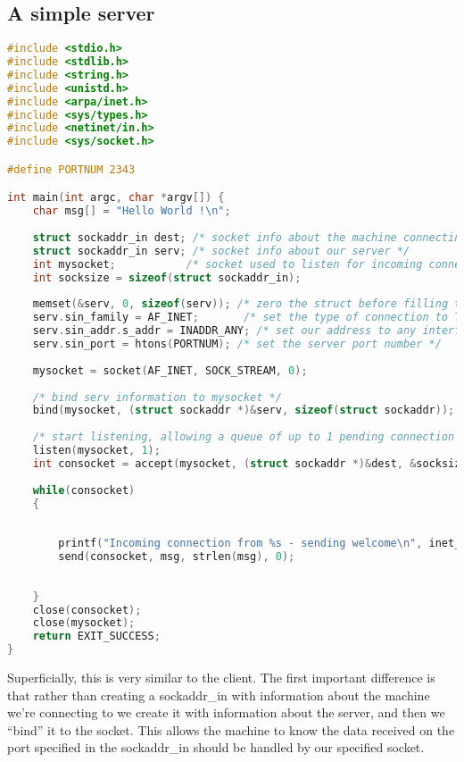 \subsection{A simple server}
\lstset{basicstyle=\scriptsize, numbers=left, captionpos=b, tabsize=4}
\begin{lstlisting}[caption=Section \thesection listing \arabic{netcnt},language={C},
breaklines=true,xleftmargin=15pt,label=lst:section\thesection listing\arabic{netcnt}]
#include <stdio.h>
#include <stdlib.h>
#include <string.h>
#include <unistd.h>
#include <arpa/inet.h>
#include <sys/types.h>
#include <netinet/in.h>
#include <sys/socket.h>

#define PORTNUM 2343

int main(int argc, char *argv[]) {
	char msg[] = "Hello World !\n";
 
	struct sockaddr_in dest; /* socket info about the machine connecting to us */
	struct sockaddr_in serv; /* socket info about our server */
	int mysocket;			/* socket used to listen for incoming connections */
	int socksize = sizeof(struct sockaddr_in);
 
	memset(&serv, 0, sizeof(serv));	/* zero the struct before filling the fields */
	serv.sin_family = AF_INET;		 /* set the type of connection to TCP/IP */
	serv.sin_addr.s_addr = INADDR_ANY; /* set our address to any interface */
	serv.sin_port = htons(PORTNUM);	/* set the server port number */	
 
	mysocket = socket(AF_INET, SOCK_STREAM, 0);
 
	/* bind serv information to mysocket */
	bind(mysocket, (struct sockaddr *)&serv, sizeof(struct sockaddr));
 
	/* start listening, allowing a queue of up to 1 pending connection */
	listen(mysocket, 1);
	int consocket = accept(mysocket, (struct sockaddr *)&dest, &socksize);
 
	while(consocket)
	{
		
 
		printf("Incoming connection from %s - sending welcome\n", inet_ntoa(dest.sin_addr));
		send(consocket, msg, strlen(msg), 0);
 
		
	}
	close(consocket);
	close(mysocket);
	return EXIT_SUCCESS;
}
\end{lstlisting}

Superficially, this is very similar to the client. The first important
difference is that rather than creating a sockaddr\_in with information about
the machine we're connecting to we create it with information about the server,
and then we ``bind'' it to the socket. This allows the machine to know the data
received on the port specified in the sockaddr\_in should be handled by our
specified socket.

